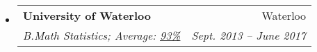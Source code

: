 \documentclass[letterpaper,11pt]{article}
\makeatletter
\newcommand{\resitem}[4]{\begin{tabular*}{17.5cm}{l@{\extracolsep{\fill}}r} \textbf{#1} & #2 \\ \textit{#3} & \textit{#4} \\ \end{tabular*} \vspace{-6pt}}
\makeatother
\begin{document}
\begin{itemize}
{	%
	\par} \vspace{-4pt}
\item 
	\resitem{University of Waterloo %
	}{Waterloo}{B.Math Statistics;
	Average: \href{https://uwaterloo.ca/registrar/transcripts/transcript-legend}{93\%}}{Sept. 2013 -- June 2017} \vspace{2pt}
	

\end{itemize}
\end{document}
